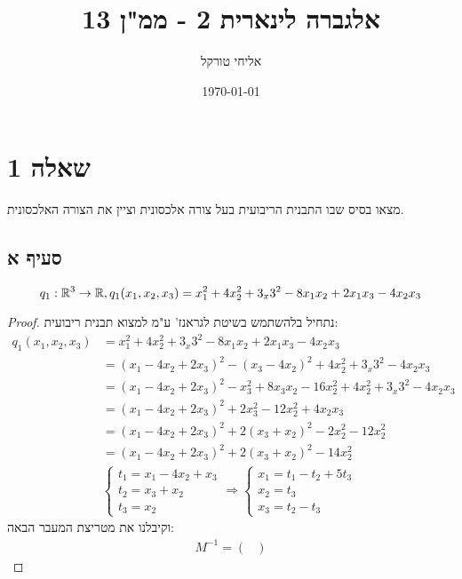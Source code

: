 \documentclass{article}
\title{אלגברה לינארית 2 - ממ"ן 13}
\author{אליחי טורקל \ID}
\date\today
\begin{document}
\maketitle %

\section*{שאלה 1}
מצאו בסיס שבו התבנית הריבועית בעל צורה אלכסונית וציין את הצורה האלכסונית.

\subsection*{סעיף א}
\[
q_1: \mathbb{R}^3 \rightarrow \mathbb{R}, q_1(x_1, x_2, x_3) = x_1^2 + 4x_2^2 + 3_x3^2 - 8x_1x_2 + 2x_1x_3 - 4x_2x_3
\]
\begin{proof}
    נתחיל בלהשתמש בשיטת לגראנז' ע"מ למצוא תבנית ריבועית:
    \begin{align*}
        q_1(x_1, x_2, x_3)
        &= x_1^2 + 4x_2^2 + 3_x3^2 - 8x_1x_2 + 2x_1x_3 - 4x_2x_3 \\
        &= (x_1 - 4x_2 +2x_3)^2 - (x_3 - 4x_2)^2  + 4x_2^2 + 3_x3^2 - 4x_2x_3 \\
        &= (x_1 - 4x_2 +2x_3)^2 - x_3^2 + 8x_3x_2 - 16x_2^2  + 4x_2^2 + 3_x3^2 - 4x_2x_3 \\
        &= (x_1 - 4x_2 +2x_3)^2 + 2x_3^2 - 12x_2^2 + 4x_2x_3 \\
        &= (x_1 - 4x_2 +2x_3)^2 + 2(x_3+x_2)^2 - 2x_2^2 - 12x_2^2 \\
        &= (x_1 - 4x_2 +2x_3)^2 + 2(x_3+x_2)^2 - 14x_2^2 \\
        &\begin{cases}
            t_1 = x_1 - 4x_2 + x_3 \\
            t_2 = x_3 + x_2 \\
            t_3 = x_2
            \end{cases} \Rightarrow
            \begin{cases}
                x_1 = t_1 - t_2 + 5t_3 \\
                x_2 = t_3 \\
                x_3 = t_2 - t_3
                \end{cases}
                \end{align*}
                וקיבלנו את מטריצת המעבר הבאה:
                \begin{align*}
                    M^{-1} = \begin{pmatrix}

\end{pmatrix}
\end{align*}
\end{proof}
\end{document}

